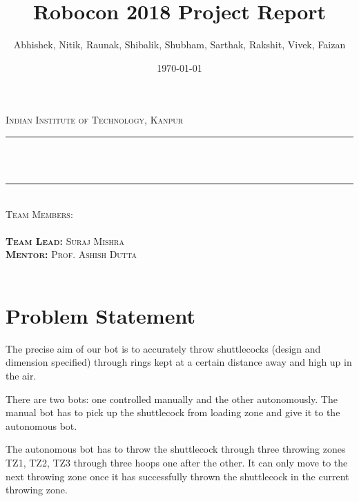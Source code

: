 \documentclass[11pt]{article}
\title{Robocon 2018 Project Report}%
\author{Abhishek, Nitik, Raunak, Shibalik, Shubham, Sarthak, Rakshit, Vivek, Faizan}%
\date{\today}%
\makeatletter
\let\thetitle\@title
\let\theauthor\@author
\let\thedate\@date
\makeatother
\begin{document}

\begin{titlepage}
    \centering
    \vspace*{0.5 cm}
    \textsc{\LARGE Indian Institute of Technology, Kanpur}\\[1 cm]   %
    \rule{\linewidth}{0.2 mm} \\[0.4 cm]
    { \huge \bfseries \thetitle}\\
    \rule{\linewidth}{0.2 mm} \\[1 cm]
    	\textsc{Team Members:}\\
    {\large \theauthor}\\[0.5 cm]
    	\textsc{\textbf{Team Lead:} Suraj Mishra}\\
        \textsc{\textbf{Mentor:} Prof. Ashish Dutta}\\[0.5 cm]
    {\large \thedate}\\[2 cm]
 
    \vfill
    
\end{titlepage}


\tableofcontents
\pagebreak


\section{Problem Statement}
The precise aim of our bot is to accurately throw shuttlecocks (design and dimension specified) through rings kept at a certain distance away and high up in the air.

There are two bots: one controlled manually and the other autonomously.
The manual bot has to pick up the shuttlecock from loading zone and give it to the autonomous bot.

The autonomous bot has to throw the shuttlecock through three throwing zones TZ1, TZ2, TZ3 through three hoops one after the other. It can only move to the next throwing zone once it has successfully thrown the shuttlecock in the current throwing zone.
\end{document}
